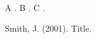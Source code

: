 \documentclass{article}
\begin{document}
A \cite{a}. B \cite[p.~5]{a}. C \cite*{a}.
\begin{thebibliography}{}
 Smith, J. (2001). Title.
\end{thebibliography}
\end{document}
